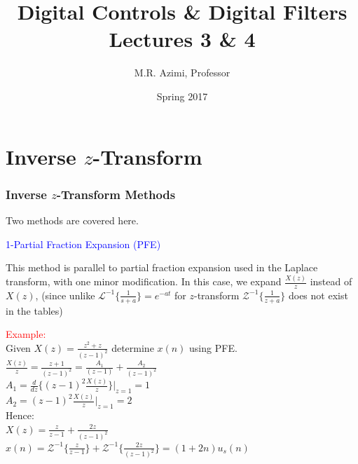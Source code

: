 \documentclass[mathserif, 10pt]{beamer} %
\title[Digital Control \& Digital Filters]{Digital Controls \& Digital Filters \\ Lectures 3 \& 4}
\author[M.R. Azimi]{M.R. Azimi, Professor}
\institute[CSU-ECE]{Department of Electrical and Computer Engineering \\ Colorado State University}
\date{Spring 2017}
\begin{document}
\frame{\titlepage}



\section{Inverse $z$-Transform}

\frame
{

\normalsize

\frametitle{Inverse $z$-Transform Methods}


Two methods are covered here.

\vspace{.1in}
\textcolor{blue}{1-Partial Fraction Expansion (PFE)}

This method is parallel to partial fraction expansion used in the Laplace transform, with one minor modification.  In this case, we expand $\frac{X(z)}{z}$ instead of $X(z)$, (since unlike $\mathcal{L}^{-1}\{\frac{1}{s+a}\}=e^{-at}$  for $z$-transform $\mathcal{Z}^{-1}\{\frac{1}{z+a} \}$ does not exist in the tables)\\ \vspace{.2in}

\vspace{.05in}
\textcolor{red}{Example:}  \\

Given $X(z) = \frac{z^2+z}{(z-1)^2}$ determine $x(n)$ using PFE.\\
$\frac{X(z)}{z}=\frac{z+1}{(z-1)^2}=\frac{A_1}{(z-1)}+\frac{A_2}{(z-1)^2}$\\
$A_1 = \frac{d}{dz} \{(z-1)^2 \frac{X(z)}{z} \}|_{z=1}=1$\\
$A_2 = (z-1)^2 \frac{X(z)}{z}|_{z=1}=2$\\ %
Hence:\\ %
$X(z) = \frac{z}{z-1}+\frac{2z}{(z-1)^2}$\\ \vspace{.1in}
$x(n) = \mathcal{Z}^{-1} \{ \frac{z}{z-1}\} +\mathcal{Z}^{-1} \{ \frac{2z}{(z-1)^2} \} = (1+2n)u_s(n)$\\


}
\end{document}
